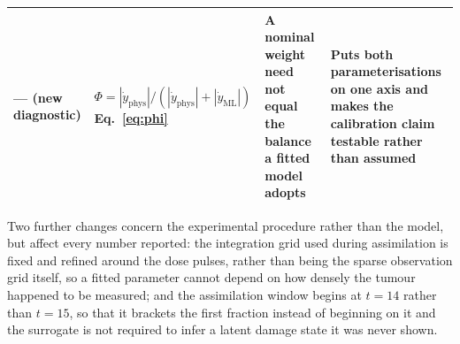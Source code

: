 \begin{table}[H]
\begin{tabular}{p{2.3cm} p{3.4cm} p{2.9cm} p{3.1cm}}
--- (new diagnostic)
&
$\Phi=|\dot y_{\mathrm{phys}}|/(|\dot y_{\mathrm{phys}}|+|\dot y_{\mathrm{ML}}|)$
\newline Eq.~\eqref{eq:phi}
&
A nominal weight need not equal the balance a fitted model adopts
&
Puts both parameterisations on one axis and makes the calibration claim testable
rather than assumed
\\
\hline
\end{tabular}
\end{table}

Two further changes concern the experimental procedure rather than the model,
but affect every number reported:
the integration grid used during assimilation is fixed and refined around the
dose pulses, rather than being the sparse observation grid itself, so a fitted
parameter cannot depend on how densely the tumour happened to be measured; and
the assimilation window begins at $t=14$ rather than $t=15$, so that it brackets
the first fraction instead of beginning on it and the surrogate is not required
to infer a latent damage state it was never shown.
